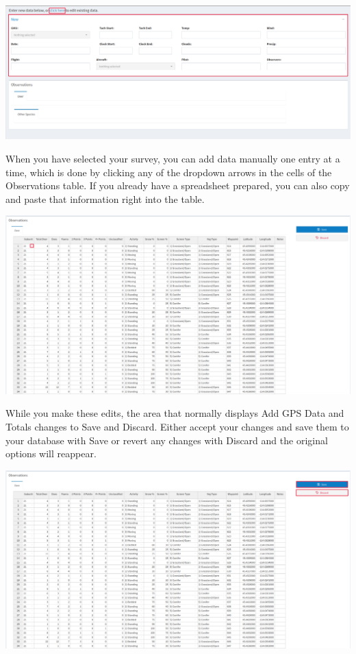 \documentclass[
]{book}
\begin{document}
\includegraphics{./www/de_walk11.png}

When you have selected your survey, you can add data manually one entry at a time, which is done by clicking any of the dropdown arrows in the cells of the Observations table. If you already have a spreadsheet prepared, you can also copy and paste that information right into the table.

\includegraphics{./www/de_walk12.png}

While you make these edits, the area that normally displays {Add GPS Data} and {Totals} changes to {Save} and {Discard}. Either accept your changes and save them to your database with {Save} or revert any changes with {Discard} and the original options will reappear.

\includegraphics{./www/de_walk13.png}
\end{document}
